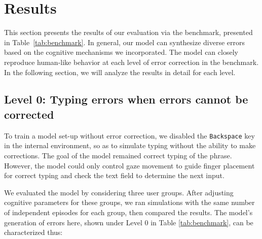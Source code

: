 \section{Results}

This section presents the results of our evaluation via the benchmark, presented in Table~\ref{tab:benchmark}.
In general, our model can synthesize diverse errors based on the cognitive mechanisms we incorporated. The model can closely reproduce human-like behavior at each level of error correction in the benchmark. In the following section, we will analyze the results in detail for each level.

\subsection{Level 0: Typing errors when errors cannot be corrected}

To train a model set-up without error correction, we disabled the \texttt{Backspace} key in the internal environment, so as to simulate typing without the ability to make corrections. The goal of the model remained correct typing of the phrase. However, the model could only control gaze movement to guide finger placement for correct typing and check the text field to determine the next input.

We evaluated the model by considering three user groups. After adjusting cognitive parameters for these groups, we ran simulations with the same number of independent episodes for each group, then compared the results. The model's generation of errors here, shown under Level 0 in Table \ref{tab:benchmark}, can be characterized thus:

